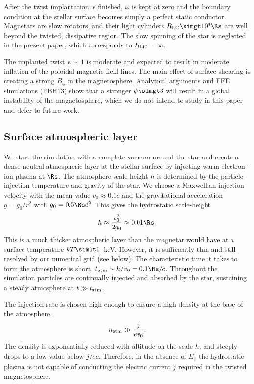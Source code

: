 After the twist implantation is finished, $\omega$ is kept at zero and the
boundary condition at the stellar surface becomes simply a perfect static
conductor. Magnetars are slow rotators, and their light cylinders $R_{\rm
  LC}\simgt 10^4\Rs$ are well beyond the twisted, dissipative region. The slow
spinning of the star is neglected in the present paper, which corresponds to
$R_{\rm LC}=\infty$.

The implanted twist $\psi\sim 1$ is moderate and expected to result
in moderate inflation of the poloidal magnetic field lines. The main effect of surface
shearing is creating a strong $B_\phi$ in the magnetosphere.
Analytical arguments
\citep[e.g.][]{2002ApJ...574.1011U} and FFE simulations (PBH13) show that a
stronger $\psi \simgt 3$ will result in a global instability of the
magnetosphere, which we do not intend to study in this paper and defer to future
work.


\subsection{Surface atmospheric layer}
\label{sec:atm}


We start the simulation with a complete vacuum around the star and create
a dense neutral atmospheric layer at the stellar surface by injecting warm electron-ion
plasma at $\Rs$.
The atmosphere scale-height $h$ is determined by the particle injection temperature and
gravity of the star. We choose a Maxwellian injection velocity with the mean value
$v_0\approx 0.1c$ and the gravitational acceleration $g = g_{0}/r^2$ with
$g_0 = 0.5\Rs c^2$. This gives the hydrostatic scale-height
\begin{equation}
  h\approx\frac{v_0^2}{2g_0}\approx 0.01\Rs.
\end{equation}
This is a much thicker atmospheric layer than the magnetar would have at a
surface temperature $kT\simlt 1$~keV. However, it is sufficiently thin and still
resolved by our numerical grid (see below).
The characteristic time it takes to form the atmosphere is short,
$t_{\rm atm}\sim h/v_0= 0.1 \Rs/c$. Throughout the simulation particles are continually
injected and absorbed by the star, sustaining a steady atmosphere at $t\gg t_{\rm atm}$.

The injection rate is chosen high enough to ensure a high density at the base of
the atmosphere,
\begin{equation}
  n_{\rm atm}\gg \frac{j}{ev_0}.
\end{equation}
The density is exponentially reduced with altitude on the scale $h$, and steeply
drops to a low value below $j/ec$. Therefore, in the absence of $E_\parallel$ the
hydrostatic plasma is not capable of conducting the electric current $j$ required in
the twisted magnetosphere.

